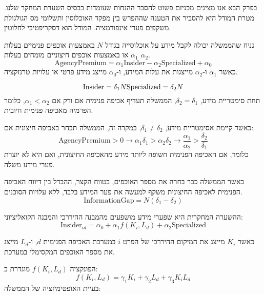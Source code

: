 
בפרק הבא אנו מציגים מכניזם פשוט להסבר ההנחות שעומדות בבסיס השערת המחקר שלנו. מטרת המודל היא להסביר את הטענה שההפרש בין מפקד האוכלוסין ותשלומי מס הגולגולת משקפים פערי אינפורמציה. המודל הוא דסקריפטיבי לחלוטין.

נניח שהממשלה יכולה לקבל מידע על אוכלוסייה בגודל \( N \) באמצעות אוכפים פנימיים בעלות \(\alpha_1\) או באמצעות אוכפים חיצוניים מומחים בעלות \(\alpha_2\). 
\begin{equation}
    \text{AgencyPremium} = \alpha_1 \text{Insider} - \alpha_2 \text{Specialized} + \alpha_0 
\end{equation}
כאשר \(\alpha_1\) ו-\(\alpha_2\) מייצגות את עלות המידע, ו-\(\alpha_0\) מייצג מידע פרטי או עלויות טרנזקציה.

$$
    \text{Insider} = \delta_1 N \\
    \text{Specialized} = \delta_2 N 
$$
תחת סימטריית מידע, \(\delta_2 = \delta_1\), הממשלה תעדיף אכיפה פנימית אם ורק אם \(\alpha_1 < \alpha_2\), כלומר הפרמיה מאכיפה פנימית חיובית.

כאשר קיימת אסימטריית מידע,
\(\delta_1 \ne \delta_2\), במקרה זה, הממשלה תבחר באכיפה חיצונית אם:
\begin{equation}
    \text{AgencyPremium} > 0 \rightarrow \alpha_1\delta_1 > \alpha_2\delta_2 \rightarrow \frac{\alpha_1}{\alpha_2} > \frac{\delta_2}{\delta_1}
\end{equation}
כלומר, אם האכיפה הפנימית חשופה ליותר מידע מהאכיפה החיצונית, ואם היא לא יוצרת פערי מידע משלה.

כאשר הממשלה כבר בחרה את מספר האוכפים, בטווח הקצר, ההבדל בין דיווח האכיפה הפנימית לאכיפה החיצונית משקף למעשה את פער המידע בלבד, ללא עלויות הסוכנים.
\begin{equation}
    \text{InformationGap} = N(\delta_1 - \delta_2)
\end{equation}

ההשערה המחקרית היא שפערי מידע מושפעים מהמבנה ההיררכי והמבנה הקואליציוני:
\begin{equation}
    \text{Insider}_{id} = \alpha_0 + \alpha_1 f(K_i, L_d) + \alpha_2 \text{Specialized}
\end{equation}

כאשר \(K_i\) מייצג את המיקום ההיררכי של הפרט \(i\) במערכת האכיפה הפנימית \(d\), ו-\(L_d\) מייצג את מספר האוכפים המקסימלי במערכת.

הפונקציה \(f(K_i, L_d)\) מוגדרת כ:
\begin{equation}
    f(K_i, L_d) = \gamma_1 K_i + \gamma_2 L_d + \gamma_3 K_i L_d
\end{equation}
בעיית האופטימיזציה של הממשלה:

